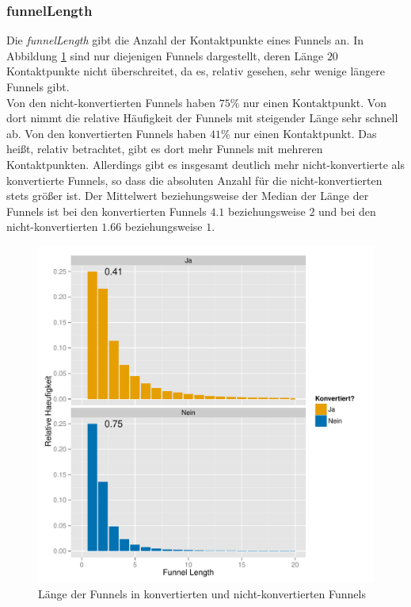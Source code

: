 \subsubsection*{funnelLength}
Die \textit{funnelLength} gibt die Anzahl der Kontaktpunkte eines Funnels an. In Abbildung \ref{funnelLength} sind nur diejenigen Funnels dargestellt, deren Länge $20$ Kontaktpunkte nicht überschreitet, da es, relativ gesehen, sehr wenige längere Funnels gibt.\\
Von den nicht-konvertierten Funnels haben $75 \%$ nur einen Kontaktpunkt. Von dort nimmt die relative Häufigkeit der Funnels mit steigender Länge sehr schnell ab. Von den konvertierten Funnels haben $41 \%$ nur einen Kontaktpunkt. Das heißt, relativ betrachtet, gibt es dort mehr Funnels mit mehreren Kontaktpunkten. Allerdings gibt es insgesamt deutlich mehr nicht-konvertierte als konvertierte Funnels, so dass die absoluten Anzahl für die nicht-konvertierten stets größer ist. Der Mittelwert beziehungsweise der Median der Länge der Funnels ist bei den konvertierten Funnels $4.1$ beziehungsweise $2$ und bei den nicht-konvertierten $1.66$ beziehungsweise $1$. 

\begin{figure}[H]
    \centering
    \includegraphics[scale=0.6]{funnelLength_First.pdf}
    \caption[Länge der Funnels]{Länge der Funnels in konvertierten und nicht-konvertierten Funnels}
    \label{funnelLength}
\end{figure}

